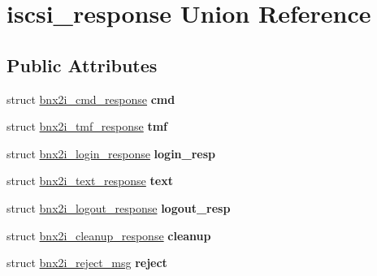 \hypertarget{unioniscsi__response}{
\section{iscsi\_\-response Union Reference}
\label{unioniscsi__response}
}
\subsection*{Public Attributes}
\begin{DoxyCompactItemize}
\item 
\hypertarget{unioniscsi__response_a78c27c0d4bdd0449290380903db24ee6}{
struct \hyperlink{structbnx2i__cmd__response}{bnx2i\_\-cmd\_\-response} {\bfseries cmd}}
\label{unioniscsi__response_a78c27c0d4bdd0449290380903db24ee6}

\item 
\hypertarget{unioniscsi__response_a2321db6a5d821af8e188de5e8cf9261c}{
struct \hyperlink{structbnx2i__tmf__response}{bnx2i\_\-tmf\_\-response} {\bfseries tmf}}
\label{unioniscsi__response_a2321db6a5d821af8e188de5e8cf9261c}

\item 
\hypertarget{unioniscsi__response_af5e1f00c415e003975d88d832129f6e1}{
struct \hyperlink{structbnx2i__login__response}{bnx2i\_\-login\_\-response} {\bfseries login\_\-resp}}
\label{unioniscsi__response_af5e1f00c415e003975d88d832129f6e1}

\item 
\hypertarget{unioniscsi__response_a27acc9174355ff049a52d7b8463af8a2}{
struct \hyperlink{structbnx2i__text__response}{bnx2i\_\-text\_\-response} {\bfseries text}}
\label{unioniscsi__response_a27acc9174355ff049a52d7b8463af8a2}

\item 
\hypertarget{unioniscsi__response_aca72f7fe57035f7045d1a0e11be5d314}{
struct \hyperlink{structbnx2i__logout__response}{bnx2i\_\-logout\_\-response} {\bfseries logout\_\-resp}}
\label{unioniscsi__response_aca72f7fe57035f7045d1a0e11be5d314}

\item 
\hypertarget{unioniscsi__response_ad5a9864c8e4c119c29535a9f1df3d93e}{
struct \hyperlink{structbnx2i__cleanup__response}{bnx2i\_\-cleanup\_\-response} {\bfseries cleanup}}
\label{unioniscsi__response_ad5a9864c8e4c119c29535a9f1df3d93e}

\item 
\hypertarget{unioniscsi__response_a1048b536b071e454bfdd9aaeb888a267}{
struct \hyperlink{structbnx2i__reject__msg}{bnx2i\_\-reject\_\-msg} {\bfseries reject}}
\label{unioniscsi__response_a1048b536b071e454bfdd9aaeb888a267}


\end{DoxyCompactItemize}
